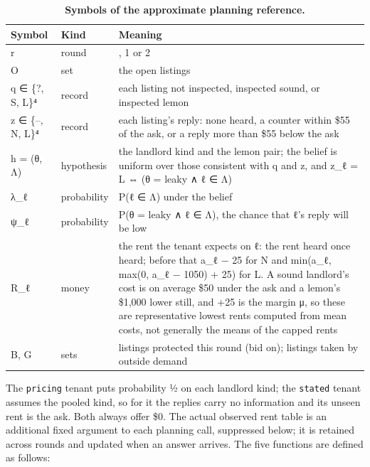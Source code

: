 \renewcommand{\thetable}{C.1}
\begin{longtable}[]{@{}
  >{\raggedright\arraybackslash}p{}
  >{\raggedright\arraybackslash}p{}
  >{\raggedright\arraybackslash}p{}@{}}
\caption{\textbf{Symbols of the approximate planning reference.}}\label{tab:C.1}\tabularnewline
\toprule\noalign{}
\begin{minipage}[b]{\linewidth}\raggedright
Symbol
\end{minipage} & \begin{minipage}[b]{\linewidth}\raggedright
Kind
\end{minipage} & \begin{minipage}[b]{\linewidth}\raggedright
Meaning
\end{minipage} \\
\midrule\noalign{}
\endhead
\bottomrule\noalign{}
\endlastfoot
r & round & 0, 1 or 2 \\
O & set & the open listings \\
q ∈ \{?, S, L\}⁴ & record & each listing not inspected, inspected sound, or inspected lemon \\
z ∈ \{--, N, L\}⁴ & record & each listing's reply: none heard, a counter within \$55 of the ask, or a reply more than \$55 below the ask \\
h = (θ, Λ) & hypothesis & the landlord kind and the lemon pair; the belief is uniform over those consistent with q and z, and z\_ℓ = L ⇔ (θ = leaky ∧ ℓ ∈ Λ) \\
λ\_ℓ & probability & P(ℓ ∈ Λ) under the belief \\
ψ\_ℓ & probability & P(θ = leaky ∧ ℓ ∈ Λ), the chance that ℓ's reply will be low \\
R\_ℓ & money & the rent the tenant expects on ℓ: the rent heard once heard; before that a\_ℓ − 25 for N and min(a\_ℓ, max(0, a\_ℓ − 1050) + 25) for L. A sound landlord's cost is on average \$50 under the ask and a lemon's \$1,000 lower still, and +25 is the margin μ, so these are representative lowest rents computed from mean costs, not generally the means of the capped rents \\
B, G & sets & listings protected this round (bid on); listings taken by outside demand \\
\end{longtable}

The \texttt{pricing} tenant puts probability ½ on each landlord kind; the \texttt{stated} tenant assumes the pooled kind, so for
it the replies carry no information and its unseen rent is the ask. Both always offer \$0. The actual observed rent table is an additional fixed argument to each planning call, suppressed below; it is retained across rounds and updated when an answer arrives. The five functions are defined as follows:

